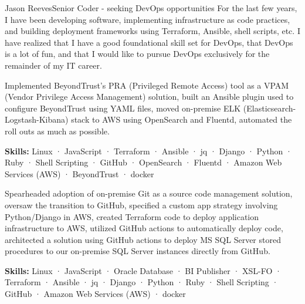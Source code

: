 \documentclass{article}
\begin{document}
\begin{cv}[avatar]{Jason Reeves}{Senior Coder - seeking DevOps opportunities}
For the last few years, I have been developing software, implementing infrastructure as code practices, and building deployment frameworks using Terraform, Ansible, shell scripts, etc.  I have realized that I have a good foundational skill set for DevOps, that DevOps is a lot of fun, and that I would like to pursue DevOps exclusively for the remainder of my IT career.

\begin{cvevent}[August 2021][present]
    Implemented BeyondTrust's PRA (Privileged Remote Access) tool as a VPAM (Vendor Privilege Access Management) solution, built an Ansible plugin used to configure BeyondTrust using YAML files, moved on-premise ELK (Elasticsearch-Logstash-Kibana) stack to AWS using OpenSearch and Fluentd, automated the roll outs as much as possible.

    \vspace*{3mm}
    \textbf{Skills:}  Linux · JavaScript · Terraform · Ansible · jq · Django · Python · Ruby · Shell Scripting · GitHub · OpenSearch · Fluentd · Amazon Web Services (AWS) · BeyondTrust · docker

    \vspace*{5mm}
\end{cvevent}

\begin{cvevent}[Mar 2018][Aug 2021]
  Spearheaded adoption of on-premise Git as a source code management solution, oversaw the transition to GitHub, specified a custom app strategy involving Python/Django in AWS, created Terraform code to deploy application infrastructure to AWS, utilized GitHub actions to automatically deploy code, architected a solution using GitHub actions to deploy MS SQL Server stored procedures to our on-premise SQL Server instances directly from GitHub.
  
  \vspace*{3mm}
  \textbf{Skills:}  Linux · JavaScript · Oracle Database · BI Publisher · XSL-FO · Terraform · Ansible · jq · Django · Python · Ruby · Shell Scripting · GitHub · Amazon Web Services (AWS) · docker
\end{cvevent}


\onecolumn
{}  %


\end{cv}
\end{document}
